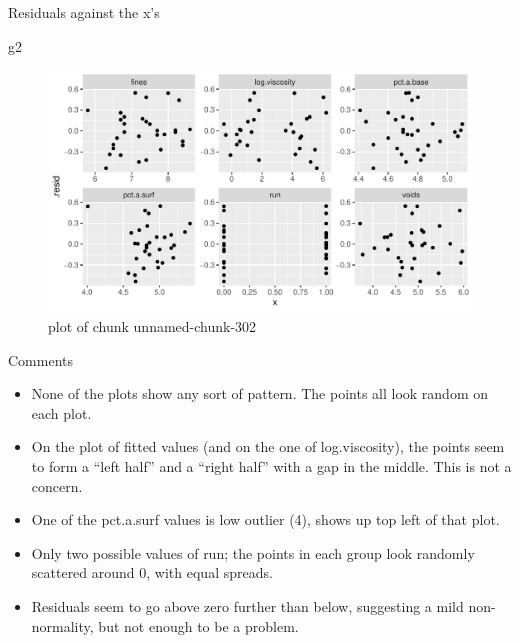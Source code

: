 \documentclass[ignorenonframetext,]{beamer}
\newenvironment{Shaded}{\begin{snugshade}}{\end{snugshade}}
\newcommand{\NormalTok}[1]{#1}
\providecommand{\tightlist}{%
  \setlength{\itemsep}{0pt}\setlength{\parskip}{0pt}}
\begin{document}
\begin{frame}[fragile]{Residuals against the x's}
\protect\hypertarget{residuals-against-the-xs}{}

\begin{Shaded}
\begin{Highlighting}[]
\NormalTok{g2}
\end{Highlighting}
\end{Shaded}

\begin{figure}
\centering
\includegraphics{figure/unnamed-chunk-302-1.pdf}
\caption{plot of chunk unnamed-chunk-302}
\end{figure}

\end{frame}

\begin{frame}{Comments}
\protect\hypertarget{comments-24}{}

\begin{itemize}
\tightlist
\item
  None of the plots show any sort of pattern. The points all look random
  on each plot.
\item
  On the plot of fitted values (and on the one of log.viscosity), the
  points seem to form a ``left half'' and a ``right half'' with a gap in
  the middle. This is not a concern.
\item
  One of the pct.a.surf values is low outlier (4), shows up top left of
  that plot.
\item
  Only two possible values of run; the points in each group look
  randomly scattered around 0, with equal spreads.
\item
  Residuals seem to go above zero further than below, suggesting a mild
  non-normality, but not enough to be a problem.
\end{itemize}

\end{frame}
\end{document}
